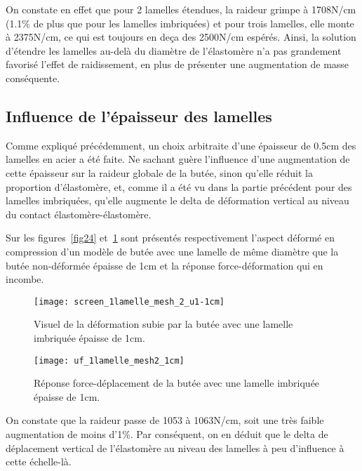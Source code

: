 ﻿\documentclass{article}
\begin{document}
On constate en effet que pour 2 lamelles étendues, la raideur grimpe à 1708N/cm (1.1\% de plus que pour les lamelles imbriquées) et pour trois lamelles, elle monte à 2375N/cm, ce qui est toujours en deça des 2500N/cm espérés. Ainsi, la solution d'étendre les lamelles au-delà du diamètre de l'élastomère n'a pas grandement favorisé l'effet de raidissement, en plus de présenter une augmentation de masse conséquente.

\subsection{Influence de l'épaisseur des lamelles}
Comme expliqué précédemment, un choix arbitraite d'une épaisseur de 0.5cm des lamelles en acier a été faite. Ne sachant guère l'influence d'une augmentation de cette épaisseur sur la raideur globale de la butée, sinon qu'elle réduit la proportion d'élastomère, et, comme il a été vu dans la partie précédent pour des lamelles imbriquées, qu'elle augmente le delta de déformation vertical au niveau du contact élastomère-élastomère.

Sur les figures~\ref{fig24} et~\ref{fig25} sont présentés respectivement l'aspect déformé en compression d'un modèle de butée avec une lamelle de même diamètre que la butée non-déformée épaisse de 1cm et la réponse force-déformation qui en incombe.

\begin{figure}[htbp]
	\begin{minipage}[c]{.45\linewidth}
	\begin{center}
	\texttt{[image: screen\_1lamelle\_mesh\_2\_u1-1cm]}
	\caption{Visuel de la déformation subie par la butée avec une lamelle imbriquée épaisse de 1cm.}
	\label{fig24}
	\end{center}
	\end{minipage}
	\hfill
	\begin{minipage}[c]{.45\linewidth}
	\begin{center}
	\texttt{[image: uf\_1lamelle\_mesh2\_1cm]}
	\caption{Réponse force-déplacement de la butée avec une lamelle imbriquée épaisse de 1cm.}
	\label{fig25}
	\end{center}
	\end{minipage}
\end{figure}

On constate que la raideur passe de 1053 à 1063N/cm, soit une très faible augmentation de moins d'1\%. Par conséquent, on en déduit que le delta de déplacement vertical de l'élastomère au niveau des lamelles à peu d'influence à cette échelle-là.
\end{document}
